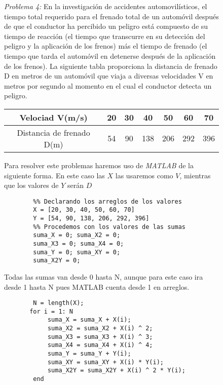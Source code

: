 \documentclass[11pt,letterpaper]{article}
\begin{document}
\begin{figure}[H]
\begin{tcolorbox}[title=Implementación en MATLAB]
\textit{Problema 4:} En la investigación de accidentes automovilísticos, el tiempo total requerido para el frenado total de un automóvil después de que el conductor ha percibido un peligro está compuesto de su tiempo de reacción (el tiempo que transcurre en su detección del peligro y la aplicación de los frenos) más el tiempo de frenado (el tiempo que tarda el automóvil en detenerse después de la aplicación de los frenos). La siguiente tabla proporciona la distancia de frenado D en metros de un automóvil que viaja a diversas velocidades V en metros por segundo al momento en el cual el conductor detecta un peligro.
\linebreak 

	\begin{center}
	\begin{tabular}{|c|c|c|c|c|c|c| }
		\hline
		Velociad V(m/s) &   20 & 30 & 40 & 50 & 60 & 70 \\
		\hline
		Distancia de frenado D(m) & 54 & 90 & 138 & 206 & 292 & 396 \\
		\hline
	\end{tabular}\end{center}
	
	\par
	

	Para resolver este problemas haremos uso de \emph{MATLAB} de la siguiente forma. En este caso las $X$ las usaremos como $V$, mientras que los valores de $Y$ serán $D$
	\begin{verbatim}
		%% Declarando los arreglos de los valores
		X = [20, 30, 40, 50, 60, 70]
		Y = [54, 90, 138, 206, 292, 396]
		%% Procedemos con los valores de las sumas
		suma_X = 0; suma_X2 = 0;
		suma_X3 = 0; suma_X4 = 0;
		suma_Y = 0; suma_XY = 0;
		suma_X2Y = 0;
		\end{verbatim}
		\par
		Todas las sumas van desde 0 hasta N, aunque para este caso ira desde 1 
		hasta N pues MATLAB cuenta desde 1 en arreglos.
		\begin{verbatim}
		N = length(X);
       for i = 1: N
            suma_X = suma_X + X(i);
            suma_X2 = suma_X2 + X(i) ^ 2;
            suma_X3 = suma_X3 + X(i) ^ 3;
            suma_X4 = suma_X4 + X(i) ^ 4;
            suma_Y = suma_Y + Y(i);
            suma_XY = suma_XY + X(i) * Y(i);
            suma_X2Y = suma_X2Y + X(i) ^ 2 * Y(i);
        end
		\end{verbatim}

	
	
\end{tcolorbox}
\end{figure}
\end{document}
